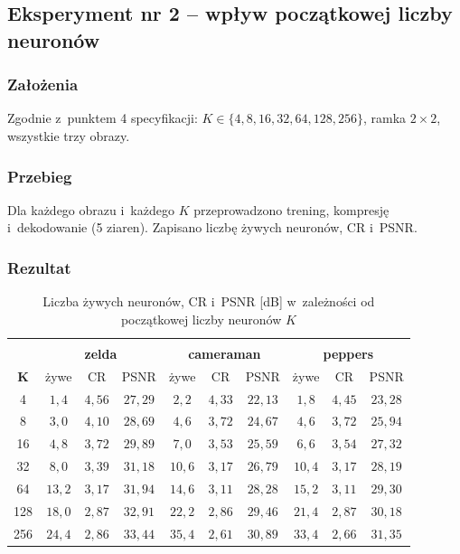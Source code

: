 \documentclass[12pt]{article}
\begin{document}
\newpage
\subsection{Eksperyment nr 2 -- wpływ początkowej liczby neuronów}

\subsubsection{Założenia}

Zgodnie z~punktem 4 specyfikacji: $K\in\{4,8,16,32,64,128,256\}$, ramka $2\times2$, wszystkie trzy obrazy.

\subsubsection{Przebieg}

Dla każdego obrazu i~każdego $K$ przeprowadzono trening, kompresję i~dekodowanie (5 ziaren).
Zapisano liczbę żywych neuronów, CR i~PSNR.

\subsubsection{Rezultat}

\begin{table}[h!]
 \caption{Liczba żywych neuronów, CR i~PSNR [dB] w~zależności od początkowej liczby neuronów $K$}
 \centering
 \small
 \vspace{0.2cm}
 \setlength{\tabcolsep}{4pt}
 \begin{tabular}{c | c c c | c c c | c c c}
  \hline\hline\\[-0.4cm]
   & \multicolumn{3}{c|}{\textbf{zelda}} & \multicolumn{3}{c|}{\textbf{cameraman}} & \multicolumn{3}{c}{\textbf{peppers}}\\
  $\boldsymbol{K}$ & żywe & CR & PSNR & żywe & CR & PSNR & żywe & CR & PSNR\\[0.1cm]
  \hline
  4 & $1{,}4$ & $4{,}56$ & $27{,}29$ & $2{,}2$ & $4{,}33$ & $22{,}13$ & $1{,}8$ & $4{,}45$ & $23{,}28$ \\
  8 & $3{,}0$ & $4{,}10$ & $28{,}69$ & $4{,}6$ & $3{,}72$ & $24{,}67$ & $4{,}6$ & $3{,}72$ & $25{,}94$ \\
  16 & $4{,}8$ & $3{,}72$ & $29{,}89$ & $7{,}0$ & $3{,}53$ & $25{,}59$ & $6{,}6$ & $3{,}54$ & $27{,}32$ \\
  32 & $8{,}0$ & $3{,}39$ & $31{,}18$ & $10{,}6$ & $3{,}17$ & $26{,}79$ & $10{,}4$ & $3{,}17$ & $28{,}19$ \\
  64 & $13{,}2$ & $3{,}17$ & $31{,}94$ & $14{,}6$ & $3{,}11$ & $28{,}28$ & $15{,}2$ & $3{,}11$ & $29{,}30$ \\
  128 & $18{,}0$ & $2{,}87$ & $32{,}91$ & $22{,}2$ & $2{,}86$ & $29{,}46$ & $21{,}4$ & $2{,}87$ & $30{,}18$ \\
  256 & $24{,}4$ & $2{,}86$ & $33{,}44$ & $35{,}4$ & $2{,}61$ & $30{,}89$ & $33{,}4$ & $2{,}66$ & $31{,}35$ \\
  \hline
 \end{tabular}
 \label{tab_main}
\end{table}
\end{document}
